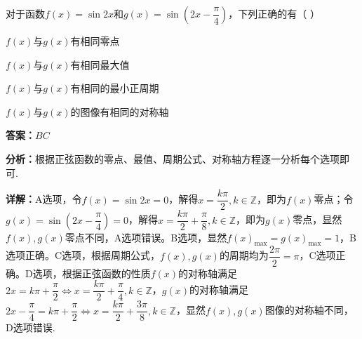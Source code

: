 \begin{question}[points=6]
对于函数$f(x)=\sin 2x$和$g(x)=\sin(2x-\dfrac{\pi}{4})$，下列正确的有（ ）
\begin{choices}
  \item $f(x)$与$g(x)$有相同零点
  \item $f(x)$与$g(x)$有相同最大值
  \item $f(x)$与$g(x)$有相同的最小正周期
  \item $f(x)$与$g(x)$的图像有相同的对称轴
\end{choices}
\begin{solution}
\textbf{答案：}$BC$

\textbf{分析：}根据正弦函数的零点、最值、周期公式、对称轴方程逐一分析每个选项即可.

\textbf{详解：}A选项，令$f(x)=\sin 2x=0$，解得$x=\dfrac{k\pi}{2},k\in\mathbb{Z}$，即为$f(x)$零点；令$g(x)=\sin(2x-\dfrac{\pi}{4})=0$，解得$x=\dfrac{k\pi}{2}+\dfrac{\pi}{8},k\in\mathbb{Z}$，即为$g(x)$零点，显然$f(x),g(x)$零点不同，A选项错误。B选项，显然$f(x)_{\max}=g(x)_{\max}=1$，B选项正确。C选项，根据周期公式，$f(x),g(x)$的周期均为$\dfrac{2\pi}{2}=\pi$，C选项正确。D选项，根据正弦函数的性质$f(x)$的对称轴满足$2x=k\pi+\dfrac{\pi}{2}\Leftrightarrow x=\dfrac{k\pi}{2}+\dfrac{\pi}{4},k\in\mathbb{Z}$，$g(x)$的对称轴满足$2x-\dfrac{\pi}{4}=k\pi+\dfrac{\pi}{2}\Leftrightarrow x=\dfrac{k\pi}{2}+\dfrac{3\pi}{8},k\in\mathbb{Z}$，显然$f(x),g(x)$图像的对称轴不同，D选项错误.
\end{solution}
\end{question}

